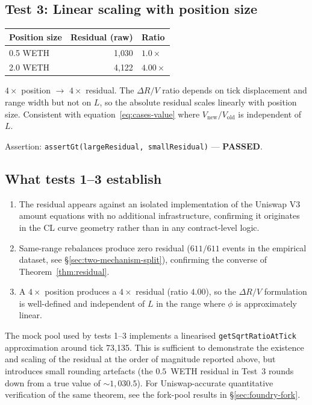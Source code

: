\documentclass[11pt,a4paper]{article}
\begin{document}
\subsection{Test 3: Linear scaling with position size}\label{sec:foundry-mock-scaling}

\begin{table}[H]
\centering
\begin{tabular}{@{}lrl@{}}
\toprule
Position size & Residual (raw) & Ratio \\
\midrule
0.5 WETH & 1{,}030 & $1.0\times$ \\
2.0 WETH & 4{,}122 & \textbf{$4.00\times$} \\
\bottomrule
\end{tabular}
\end{table}

$4\times$ position $\to$ $4\times$ residual. The $\Delta R/V$ ratio depends on tick displacement and range width but not on $L$, so the absolute residual scales linearly with position size. Consistent with equation~\eqref{eq:cases-value} where $V_{\text{new}}/V_{\text{old}}$ is independent of $L$.

Assertion: \texttt{assertGt(largeResidual, smallResidual)} --- \textbf{PASSED}.

\subsection{What tests 1--3 establish}\label{sec:foundry-mock-summary}

\begin{enumerate}[leftmargin=*]
    \item The residual appears against an isolated implementation of the Uniswap V3 amount equations with no additional infrastructure, confirming it originates in the CL curve geometry rather than in any contract-level logic.
    \item Same-range rebalances produce zero residual ($611/611$ events in the empirical dataset, see \S\ref{sec:two-mechanism-split}), confirming the converse of Theorem~\ref{thm:residual}.
    \item A $4\times$ position produces a $4\times$ residual (ratio $4.00$), so the $\Delta R/V$ formulation is well-defined and independent of $L$ in the range where $\phi$ is approximately linear.
\end{enumerate}

The mock pool used by tests 1--3 implements a linearised \texttt{getSqrtRatioAtTick} approximation around tick 73{,}135. This is sufficient to demonstrate the existence and scaling of the residual at the order of magnitude reported above, but introduces small rounding artefacts (the $0.5$~WETH residual in Test~3 rounds down from a true value of $\sim 1{,}030.5$). For Uniswap-accurate quantitative verification of the same theorem, see the fork-pool results in \S\ref{sec:foundry-fork}.
\end{document}
